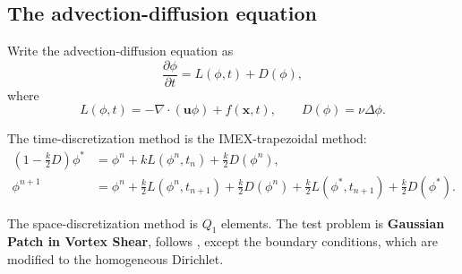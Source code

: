 \documentclass[lang=en,11pt,a4paper,bibend=bibtex]{elegantpaper}
\begin{document}
\subsection{The advection-diffusion equation}

Write the advection-diffusion equation as
\begin{equation}
    \frac{\partial \phi}{\partial t}=L(\phi,t)+D(\phi),
\end{equation}
where
\begin{equation*}
    L(\phi,t)=-\nabla\cdot(\mathbf{u}\phi)+f(\mathbf{x},t),
    \qquad D(\phi)=\nu\Delta\phi.
\end{equation*}

The time-discretization method is the IMEX-trapezoidal method:
\begin{align*}
    \left(1-\frac{k}{2}D\right)\phi^* &= 
    \phi^n+kL(\phi^n,t_n)+\frac{k}{2}D(\phi^n),\\
    \phi^{n+1} &= \phi^n 
    + \frac{k}{2}L(\phi^n,t_{n+1}) + \frac{k}{2}D(\phi^n)
    + \frac{k}{2}L(\phi^*,t_{n+1}) + \frac{k}{2}D(\phi^*).
\end{align*}

The space-discretization method is $Q_1$ elements. 
The test problem is \textbf{Gaussian Patch in Vortex Shear}, 
follows \cite{Zhang2012}, except the boundary conditions, 
which are modified to the homogeneous Dirichlet.
\end{document}
